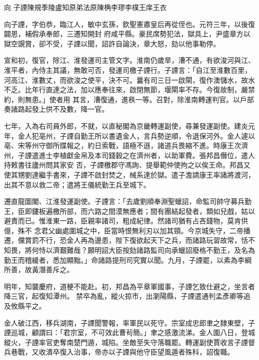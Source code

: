 
\begin{pinyinscope}

 向
 子諲陳規季陵盧知原弟法原陳桷李璆李樸王庠王衣



 向子諲，字伯恭，臨江人，敏中玄孫，欽聖憲肅皇后再從侄也。元符三年，以後復闢恩，補假承奉郎，三遷知開封
 府咸平縣。豪民席勢犯法，獄具上，尹盛章方以獄空覬賞，卻不受，子諲以聞，詔許自論決，章大怒，劾以他事勒停。



 宣和初，復官，除江、淮發運司主管文字。淮南仍歲旱，漕不通，有欲浚河與江、淮平者，內侍主其議，無敢可否，發運司檄子諲行。子諲言：「自江至淮數百里，河高江、淮數丈，而欲浚之使平，決不可。曩有司三日一啟閘，復作澳儲水，故水不乏。比年行直達之法，加以應奉往來，啟閉無節，堰閘率不存。今復故制，嚴禁約，則無患。」使者用
 其言，漕復通，進秩一等。召對，除淮南轉運判官。以戶部奏諸路起發上供不及數，降一官。



 七年，入為右司員外郎，不就，以直秘閣為京畿轉運副使，尋兼發運副使。建炎元年，金人犯亳州，子諲自勤王所以書遺金人，言兵勢逆順，令退保河外。金人遽以亳、宋等州守御所牒報之，約日索戰，語極不遜，諸道兵畏縮不進。時康王次濟州，子諲遣進士李植獻金帛及本司錢穀之在濟州者，以助軍費。張邦昌僭位，遣人持敕書往廬州問其家安
 否，子諲檄郡守馮詢、提舉範仲使拘之以俟王命。邦昌又使其甥劉達繼手書來，子諲不啟封焚之，械系達於獄。遣子澹請康王率諸將渡河，出其不意以救二帝；遣將王儀統勤王兵至城下。



 遷直龍圖閣、江淮發運副使。子諲言：「去歲劉順奉淵聖蠟詔，命監司帥守募兵勤王，臣即鏤板遍檄所部，而六路之間漠無應者；間有團結起發者，類如兒戲，姑以避責而已。惟淮東一路，臣親率諸司，粗成紀律。然諸司猶有占吝錢物，莫肯供億，殊不
 念君父幽處圍城之中，臣當時恨無利刃以加其頸。今京城失守，二帝播遷，儻賞罰不行，恐金人再為邊患，陛下復欲起天下之兵，而諸路玩習故常，恬不知畏，將何恃以濟艱難哉？願明詔大臣按劾諸路監司向承蠟詔廢格不勤王，及名為勤王而稽緩者，悉加顯黜。」命諸路提刑司究實以聞。九月，子諲罷，以素為李綱所善，故黃潛善斥之。



 明年，知襲慶府，道梗不能赴。初，邦昌為平章軍國事，子諲乞致仕避之，坐言者降三官，起復知潭州。
 禁卒為亂，縱火掠市，出瀏陽縣，子諲遣通判孟彥卿等追及攸縣平之。



 金人破江西，移兵湖南，子諲聞警報，率軍民以死守。宗室成忠郎聿之隸東壁，子諲巡城，顧謂曰：「君宗室，不可效此曹茍簡。」聿之感激流涕。金人圍八日，登城縱火，子諲率官吏奪南楚門遁，城陷。坐敵至失守落職罷。轉運副使賈收言子諲督兵巷戰，又收潰卒復入治事，帝亦以子諲與他守臣望風遁者殊科，詔復職。




\end{pinyinscope}
